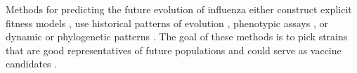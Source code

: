 \documentclass[reprint,amsmath,amssymb,superscriptaddress,showpacs,rmp]{revtex4-1}
\begin{document}


Methods for predicting the future evolution of influenza either construct explicit fitness models \citep{luksza_predictive_2014,huddleston_integrating_2020}, use historical patterns of evolution \citep{luksza_predictive_2014,bush_predicting_1999}, phenotypic assays \citep{neher_prediction_2016,steinbruck_inference_2012}, or dynamic or phylogenetic patterns \citep{neher_predicting_2014,klingen_sweep_2018}.
The goal of these methods is to pick strains that are good representatives of future populations and could serve as vaccine candidates \citep{morris2018predictive}.
\end{document}
